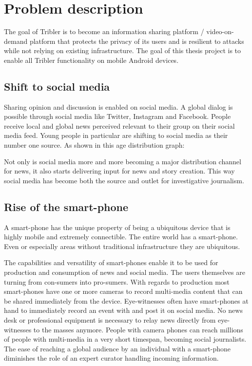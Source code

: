 \chapter{Problem description}

The goal of Tribler is to become an information sharing platform / video-on-demand platform that protects the privacy of its users and is resilient to attacks while not relying on existing infrastructure.
The goal of this thesis project is to enable all Tribler functionality on mobile Android devices.


\section{Shift to social media}
Sharing opinion and discussion is enabled on social media.
A global dialog is possible through social media like Twitter, Instagram and Facebook.
People receive local and global news perceived relevant to their group on their social media feed.
Young people in particular are shifting to social media as their number one source. \cite{reuters_social_media}
As shown in this age distribution graph:

Not only is social media more and more becoming a major distribution channel for news, it also starts delivering input for news and story creation.
This way social media has become both the source and outlet for investigative journalism.


\section{Rise of the smart-phone}
A smart-phone has the unique property of being a ubiquitous device that is highly mobile and extremely connectible.
The entire world has a smart-phone.
Even or especially areas without traditional infrastructure they are ubiquitous.

The capabilities and versatility of smart-phones enable it to be used for production and consumption of news and social media.
The users themselves are turning from con-sumers into pro-sumers.
With regards to production most smart-phones have one or more cameras to record multi-media content that can be shared immediately from the device.
Eye-witnesses often have smart-phones at hand to immediately record an event with and post it on social media.
No news desk or professional equipment is necessary to relay news directly from eye-witnesses to the masses anymore.
People with camera phones can reach millions of people with multi-media in a very short timespan, becoming social journalists.
The ease of reaching a global audience by an individual with a smart-phone diminishes the role of an expert curator handling incoming information.

